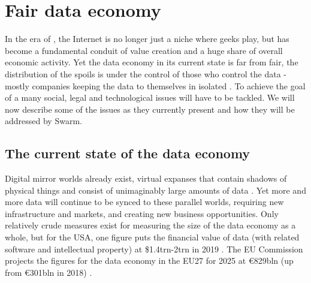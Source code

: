 \section{Fair data economy  \statusgreen}\label{sec:fair-data}
\green{}

In the era of , the Internet is no longer just a niche where geeks play, but has become a fundamental conduit of value creation and a huge share of overall economic activity. Yet the data economy in its current state is far from fair, the distribution of the spoils is under the control of those who control the data - mostly companies keeping the data to themselves in isolated . To achieve the goal of a  many social, legal and technological issues will have to be tackled. We will now describe some of the issues as they  currently present and how they will be addressed by Swarm. 

\subsection{The current state of the data economy  \statusgreen} \label{sec:dataeconomy}

Digital mirror worlds already exist, virtual expanses that contain shadows of physical things and consist of unimaginably large amounts of data \cite{MirrorWorlds2020Feb}. Yet more and more data will continue to be synced to these parallel worlds, requiring new infrastructure and markets, and creating new business opportunities. Only relatively crude measures exist for measuring the size of the data economy as a whole, but for the USA, one figure puts the financial value of data (with related software and intellectual property) at \$1.4trn-2trn in 2019 \cite{MirrorWorlds2020Feb}. The EU Commission projects the figures for the data economy in the EU27 for 2025 at €829bln (up from €301bln in 2018) \cite{EUDataStrategy2020Feb}. 

